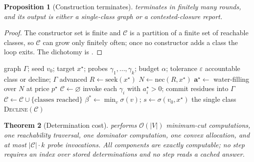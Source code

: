\documentclass[11pt,twocolumn,a4paper]{article}
\theoremstyle{dirthm}
\newtheorem{theorem}{Theorem}[section]
\newtheorem{proposition}[theorem]{Proposition}
\theoremstyle{definition}
\theoremstyle{remark}
\newcommand{\Gph}{\Gamma}
\newcommand{\V}{V}
\newcommand{\E}{E}
\newcommand{\flo}{\beta}
\newcommand{\str}{\sigma}
\newcommand{\Om}{\Omega}
\newcommand{\Cell}{\mathcal{C}}
\newcommand{\price}{p^{\star}}
\newcommand{\att}{\alpha}
\newcommand{\alloc}{\mathbf{a}}
\newcommand{\nec}{\mathrm{nec}}
\newcommand{\seek}{\mathrm{seek}}
\newcommand{\abs}[1]{\lvert#1\rvert}
\newcommand{\set}[1]{\{#1\}}
\newcommand{\eps}{\varepsilon}
\begin{document}
\begin{proposition}[Construction terminates]
\label{prop:construct-terminates}
 terminates in finitely many rounds, and its output is
either a single-class graph or a contested-closure report.
\end{proposition}

\begin{proof}
The constructor set is finite and $\Cell$ is a partition of a finite set of
reachable classes, so $\Cell$ can grow only finitely often; once no
constructor adds a class the loop exits. The dichotomy is
.
\end{proof}

\begin{algorithm}[H]
\caption{Determination by the directional pair}
\label{alg:determine}
\begin{algorithmic}[1]
\Require graph $\Gph$; seed $v_0$; target $x^{\star}$; probes
$\gamma_1,\dots,\gamma_k$; budget $\att$; tolerance $\eps$
\Ensure accountable class or decline; $\Gph$ advanced
\State $R\gets\seek(x^{\star})$
   \Comment{reachability, $\mathcal{O}(\abs{\V}+\abs{\E})$}
\State $N\gets\nec(R,x^{\star})$
\State $\alloc^{\star}\gets$ water-filling over $N$ at price $\price$
\State $\Cell\gets\varnothing$
\Repeat
  \State invoke each $\gamma_i$ with $a_i^{\star}>0$; commit residues into
         $\Gph$ 
  \State $\Cell\gets\Cell\cup\set{\text{classes reached}}$
\State $\flo^{\ast}\gets\min_v\str(v)$;\quad
       $s\gets\str(v_0,x^{\star})$
\If{$s\le\flo^{\ast}+\eps\Om$ \textbf{and} $\abs{\Cell}=1$}
  \State \Return the single class 
\Else
  \State \Return \textsc{Decline}$(\Cell)$
\EndIf
\end{algorithmic}
\end{algorithm}

\begin{theorem}[Determination cost]
\label{thm:determine-cost}
 performs $\mathcal{O}(\abs{\V})$ minimum-cut
computations, one reachability traversal, one dominator computation, one
convex allocation, and at most $\abs{\Cell}\cdot k$ probe invocations. All
components are exactly computable; no step requires an index over stored
determinations and no step reads a cached answer.
\end{theorem}
\end{document}
